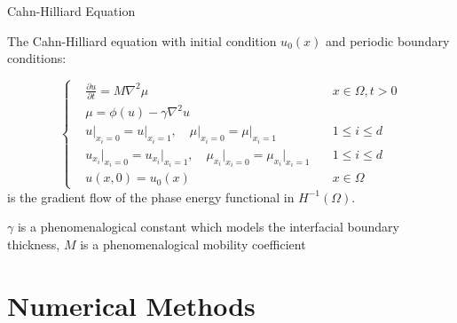 \documentclass[professionalfont]{beamer}
\theoremstyle{remark}
\begin{document}
\begin{frame}{Cahn-Hilliard Equation}
	
	The Cahn-Hilliard equation with initial condition $u_0(x)$ and periodic boundary conditions:

	\begin{equation} \label{eq_CH}
		\left\{
			\begin{split}
				&\frac{\partial u}{\partial t}=M\nabla^2\mu&x\in\Omega,t>0\\
				&\mu=\phi(u)-\gamma\nabla^2u\\
				&u\big|_{x_i=0}=u\big|_{x_i=1},\quad\mu\big|_{x_i=0}=\mu\big|_{x_i=1}\quad&1\le i\le d\\
				&u_{x_i}\big|_{x_i=0}=u_{x_i}\big|_{x_i=1},\quad\mu_{x_i}\big|_{x_i=0}=\mu_{x_i}\big|_{x_i=1}\quad&1\le i\le d\\
				&u(x,0)=u_0(x)&x\in\Omega
			\end{split}	
		\right.
	\end{equation}
	is the gradient flow of the phase energy functional in $H^{-1}(\Omega)$.

	\vspace{10 pt}

	$\gamma$ is a phenomenalogical constant which models the interfacial boundary thickness, $M$ is a phenomenalogical mobility coefficient

\end{frame}





\section{Numerical Methods}
\end{document}
